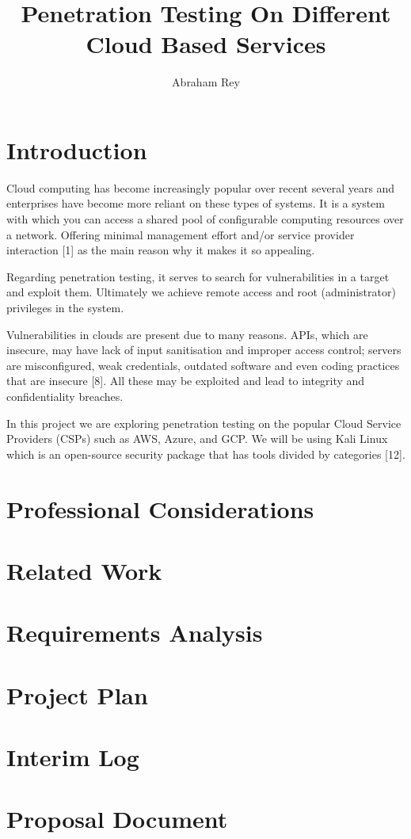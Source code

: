 \documentclass{report}
\title{Penetration Testing On Different Cloud Based Services}
\author{Abraham Rey}
\begin{document}
\maketitle

\section{Introduction}
Cloud computing has become increasingly popular over recent several years and enterprises have become more reliant on these types of systems. It is a system with which you can access a shared pool of configurable computing resources over a network. Offering minimal management effort and/or service provider interaction [1] as the main reason why it makes it so appealing. 

Regarding penetration testing, it serves to search for vulnerabilities in a target and exploit them. Ultimately we achieve remote access and root (administrator) privileges in the system. 

Vulnerabilities in clouds are present due to many reasons. APIs, which are insecure, may have lack of input sanitisation and improper access control; servers are misconfigured, weak credentials, outdated software and even coding practices that are insecure [8]. All these may be exploited and lead to integrity and confidentiality breaches.

In this project we are exploring penetration testing on the popular Cloud Service Providers (CSPs) such as AWS, Azure, and GCP. We will be using Kali Linux which is an open-source security package that has tools divided by categories [12]. 

\section{Professional Considerations}
\section{Related Work}
\section{Requirements Analysis}
\section{Project Plan}
\section{Interim Log}
\section{Proposal Document}
\end{document}
